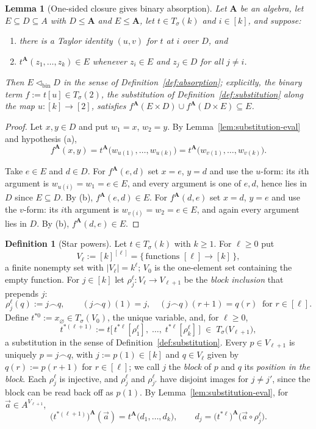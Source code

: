 \documentclass[11pt]{article}
\theoremstyle{mainplain}
\newtheorem{lemma}[theorem]{Lemma}
\theoremstyle{mainroman}
\theoremstyle{definition}
\newtheorem{definition}[theorem]{Definition}
\newcommand{\alphlabels}{\renewcommand{\labelenumi}{\textup{(\alph{enumi})}}%
  \renewcommand{\theenumi}{\alph{enumi}}}
\providecommand{\tightlist}{\setlength{\itemsep}{0pt}\setlength{\parskip}{0pt}}
\numberwithin{equation}{section}
\newcommand{\bA}{\mathbf A}
\newcommand{\abin}{\lhd_{\mathrm{bin}}}
\newcommand{\Tm}{T_\sigma}
\begin{document}
\begin{lemma}[One-sided closure gives binary absorption]\label{lem:taylor-binary}
Let $\bA$ be an algebra, let $E\subseteq D\subseteq A$ with $D\le\bA$ and
$E\le\bA$, let $t\in\Tm(k)$ and $i\in[k]$, and suppose:
\begin{enumerate}\alphlabels\tightlist
\item there is a Taylor identity $(u,v)$ for $t$ at $i$ over $D$, and
\item $t^{\bA}(z_1,\dots,z_k)\in E$ whenever $z_i\in E$ and $z_j\in D$ for all
      $j\ne i$.
\end{enumerate}
Then $E\abin D$ in the sense of Definition~\ref{def:absorption}; explicitly, the
binary term $f:=t[u]\in\Tm(2)$, the substitution of
Definition~\ref{def:substitution} along the map $u:[k]\to[2]$, satisfies
$f^{\bA}(E\times D)\cup f^{\bA}(D\times E)\subseteq E$.
\end{lemma}
\begin{proof}
Let $x,y\in D$ and put $w_1=x$, $w_2=y$. By
Lemma~\ref{lem:substitution-eval} and hypothesis (a),
\[
 f^{\bA}(x,y)=t^{\bA}\bigl(w_{u(1)},\dots,w_{u(k)}\bigr)
            =t^{\bA}\bigl(w_{v(1)},\dots,w_{v(k)}\bigr).
\]

Take $e\in E$ and $d\in D$. For $f^{\bA}(e,d)$ set $x=e$, $y=d$ and use the
$u$-form: its $i$th argument is $w_{u(i)}=w_1=e\in E$, and every argument is one
of $e,d$, hence lies in $D$ since $E\subseteq D$. By (b),
$f^{\bA}(e,d)\in E$. For $f^{\bA}(d,e)$ set $x=d$, $y=e$ and use the $v$-form:
its $i$th argument is $w_{v(i)}=w_2=e\in E$, and again every argument lies in
$D$. By (b), $f^{\bA}(d,e)\in E$.
\end{proof}

\begin{definition}[Star powers]\label{def:star}
Let $t\in\Tm(k)$ with $k\ge1$. For $\ell\ge0$ put
\[
 V_{\ell}:=[k]^{[\ell]}=\{\,\text{functions }[\ell]\to[k]\,\},
\]
a finite nonempty set with $|V_{\ell}|=k^{\ell}$; $V_0$ is the one-element set
containing the empty function. For $j\in[k]$ let
$\rho^{\ell}_j:V_{\ell}\to V_{\ell+1}$ be the \emph{block inclusion} that
prepends $j$:
\[
 \rho^{\ell}_j(q):=j\frown q,\qquad
 (j\frown q)(1)=j,\quad (j\frown q)(r+1)=q(r)\ \text{ for }r\in[\ell].
\]
Define $t^{*0}:=x_{\varnothing}\in\Tm(V_0)$, the unique variable, and, for
$\ell\ge0$,
\[
 t^{*(\ell+1)}:=t\bigl[\,t^{*\ell}[\rho^{\ell}_1],\;\dots,\;t^{*\ell}[\rho^{\ell}_k]\,\bigr]
 \;\in\;\Tm\bigl(V_{\ell+1}\bigr),
\]
a substitution in the sense of Definition~\ref{def:substitution}. Every
$p\in V_{\ell+1}$ is uniquely $p=j\frown q$, with $j:=p(1)\in[k]$ and
$q\in V_{\ell}$ given by $q(r):=p(r+1)$ for $r\in[\ell]$; we call $j$ the
\emph{block} of $p$ and $q$ its \emph{position in the block}. Each
$\rho^{\ell}_j$ is injective, and $\rho^{\ell}_j$ and $\rho^{\ell}_{j'}$ have
disjoint images for $j\ne j'$, since the block can be read back off as $p(1)$.
By Lemma~\ref{lem:substitution-eval},
for $\vec a\in A^{V_{\ell+1}}$,
\[
 \bigl(t^{*(\ell+1)}\bigr)^{\bA}(\vec a)
 = t^{\bA}\bigl(d_1,\dots,d_k\bigr),\qquad
 d_j=\bigl(t^{*\ell}\bigr)^{\bA}\bigl(\vec a\circ\rho^{\ell}_j\bigr).
\]
\end{definition}
\end{document}
